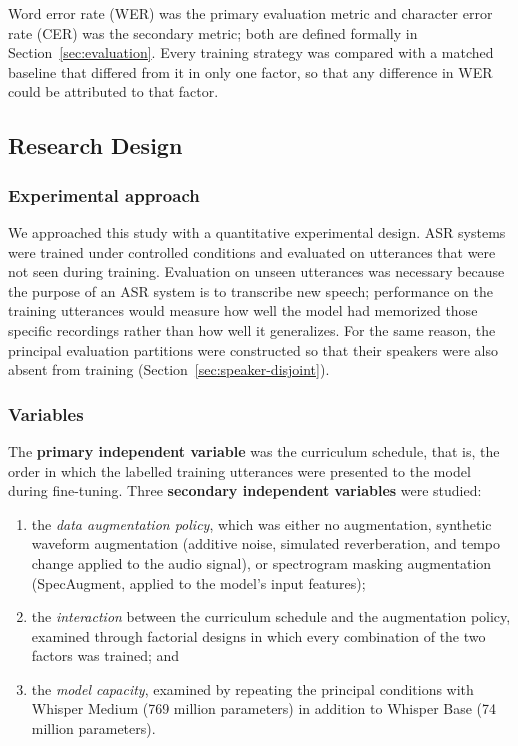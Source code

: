 Word error rate (WER) was the primary evaluation metric and character error rate
(CER) was the secondary metric; both are defined formally in
Section~\ref{sec:evaluation}. Every training strategy was compared with a
matched baseline that differed from it in only one factor, so that any
difference in WER could be attributed to that factor.

\subsection{Research Design}
\label{sec:research-design}

\subsubsection{Experimental approach}

We approached this study with a quantitative experimental design. ASR systems
were trained under controlled conditions and evaluated on utterances that were
not seen during training. Evaluation on unseen utterances was necessary because
the purpose of an ASR system is to transcribe new speech; performance on the
training utterances would measure how well the model had memorized those
specific recordings rather than how well it generalizes. For the same reason, the
principal evaluation partitions were constructed so that their speakers were
also absent from training (Section~\ref{sec:speaker-disjoint}).

\subsubsection{Variables}

The \textbf{primary independent variable} was the curriculum schedule, that is,
the order in which the labelled training utterances were presented to the model
during fine-tuning. Three \textbf{secondary independent variables} were studied:

\begin{enumerate}
    \item the \emph{data augmentation policy}, which was either no augmentation,
    synthetic waveform augmentation (additive noise, simulated reverberation, and
    tempo change applied to the audio signal), or spectrogram masking
    augmentation (SpecAugment, applied to the model's input features);
    \item the \emph{interaction} between the curriculum schedule and the
    augmentation policy, examined through factorial designs in which every
    combination of the two factors was trained; and
    \item the \emph{model capacity}, examined by repeating the principal
    conditions with Whisper Medium (769 million parameters) in addition to
    Whisper Base (74 million parameters).
\end{enumerate}

